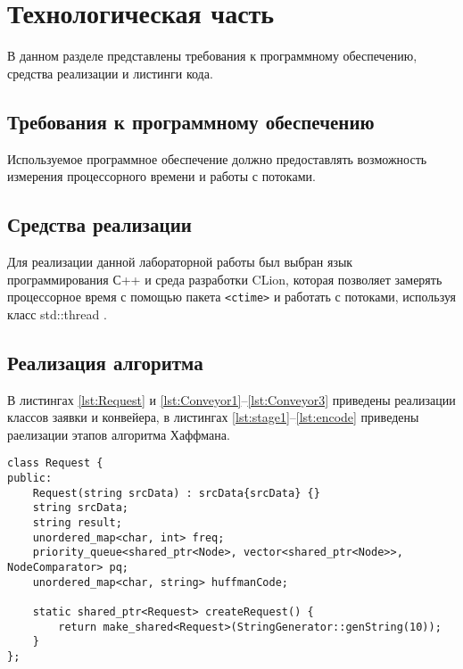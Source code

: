\chapter{Технологическая часть}

В данном разделе представлены требования к программному обеспечению, средства реализации и листинги кода.

\section{Требования к программному \newline обеспечению}

Используемое программное обеспечение должно предоставлять возможность измерения процессорного времени и работы с потоками.

\section{Средства реализации}

Для реализации данной лабораторной работы был выбран язык программирования С++ \cite{c} и среда разработки CLion, которая позволяет замерять процессорное время с помощью пакета \texttt{<ctime>} \cite{ctime} и работать с потоками, используя класс std::thread \cite{thread}.

\section{Реализация алгоритма}

В листингах \ref{lst:Request} и \ref{lst:Conveyor1}--\ref{lst:Conveyor3} приведены реализации классов заявки и конвейера, в листингах \ref{lst:stage1}--\ref{lst:encode} приведены раелизации этапов алгоритма Хаффмана.

\clearpage
\begin{lstlisting}[label=lst:Request,caption=Класс Request]
class Request {
public:
	Request(string srcData) : srcData{srcData} {}	
	string srcData;
	string result;
	unordered_map<char, int> freq;
	priority_queue<shared_ptr<Node>, vector<shared_ptr<Node>>, NodeComparator> pq;
	unordered_map<char, string> huffmanCode;
	
	static shared_ptr<Request> createRequest() {
		return make_shared<Request>(StringGenerator::genString(10));
	}
};
\end{lstlisting}

